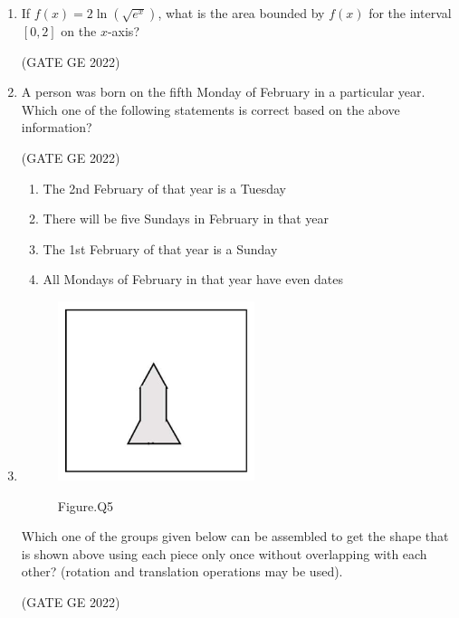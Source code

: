\documentclass[journal,12pt,onecolumn]{IEEEtran}
\theoremstyle{remark}
\begin{document}
\begin{enumerate}
\item If $f(x) = 2 \ln(\sqrt{e^x})$, what is the area bounded by $f(x)$ for the interval $[0, 2]$ on the $x$-axis?

\hfill (GATE GE 2022)

\begin{enumerate}
\end{enumerate}

\item A person was born on the fifth Monday of February in a particular year. Which one of the following statements is correct based on the above information?

\hfill (GATE GE 2022)

\begin{enumerate}
    \item The 2nd February of that year is a Tuesday
    \item There will be five Sundays in February in that year
    \item The 1st February of that year is a Sunday
    \item All Mondays of February in that year have even dates
\end{enumerate}

\item
\begin{figure}[H]
    \centering
    \includegraphics[width=0.3\columnwidth]{figs/fig_5.png}
    \label{fig:question5}
    \caption*{Figure.Q5}
\end{figure}
Which one of the groups given below can be assembled to get the shape that is shown above using each piece only once without overlapping with each other? (rotation and translation operations may be used).

\hfill (GATE GE 2022)


\end{enumerate}
\end{document}

